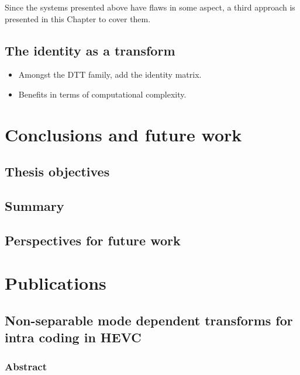 \documentclass[11pt,a4paper,openright,twoside]{book}
\numberwithin{equation}{section} %
\numberwithin{figure}{section} %
\numberwithin{table}{section} %
\begin{document}
Since the systems presented above have flaws in some aspect, a third approach
is presented in this Chapter to cover them.

\section{The identity as a transform}
\label{sec:the_identity_as_a_transform}

\begin{itemize}
	\item Amongst the \ac{DTT} family, add the identity matrix.
	\item Benefits in terms of computational complexity.
\end{itemize}

\chapter*{Conclusions and future work}
\label{cha:conclusions_and_future_work}

\section*{Thesis objectives}
\label{sec:thesis_objectives}

\section*{Summary}
\label{sec:summary}

\section*{Perspectives for future work}
\label{sec:perspectives_for_future_work}

\chapter*{Publications}
\label{cha:publications}

\section*{Non-separable mode dependent transforms for intra coding in HEVC}
\label{sec:non_separable_mode_dependent_transforms_for_intra_coding_in_hevc}

\subsection*{Abstract}
\label{sub:mddt_abstract}
\end{document}
